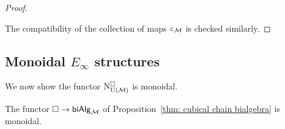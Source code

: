 \begin{proof}
\begin{center}
		\qquad
		\qquad
	\end{center}
	The compatibility of the collection of maps $\varepsilon_{\mathcal{M}}$ is checked similarly.
\end{proof}

\subsection{Monoidal $E_\infty$ structures}

We now show the functor $\operatorname{N^{\square}_{{\mathrm{U}(\mathcal{M})}}}$ is monoidal.
\begin{theorem} \label{chainsismonoidal}
	The functor $\square \to \mathsf{biAlg}_{\mathcal{M}}$ of Proposition~\ref{thm: cubical chain bialgebra} is monoidal.
\end{theorem}

